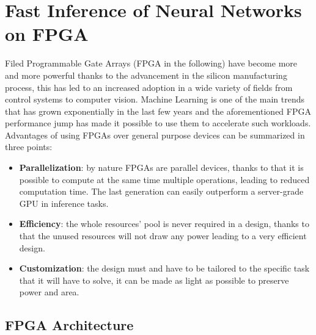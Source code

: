 \documentclass[../../main.tex]{subfiles}
\begin{document}
    
    \chapter{Fast Inference of Neural Networks on FPGA}
    \label{sec:FPGA_NN}
    
Filed Programmable Gate Arrays (FPGA in the following) have become more and more powerful thanks to the advancement in the silicon manufacturing process, this has led to an increased adoption in a wide variety of fields from control systems to computer vision.  
Machine Learning is one of the main trends that has grown exponentially in the last few years and the aforementioned FPGA performance jump has made it possible to use them to accelerate such workloads.  
Advantages of using FPGAs over general purpose devices can be summarized in three points:  
\begin{itemize}
    \item \textbf{Parallelization}: by nature FPGAs are parallel devices, thanks to that it is possible to compute at the same time multiple operations, leading to reduced computation time. The last generation can easily outperform a server-grade GPU in inference tasks\cite{FPGA-inf}.
    \item \textbf{Efficiency}: the whole resources' pool is never required in a design, thanks to that the unused resources will not draw any power leading to a very efficient design.  
    \item \textbf{Customization}: the design must and have to be tailored to the specific task that it will have to solve, it can be made as light as possible to preserve power and area.  
\end{itemize}
    
    
\section{FPGA Architecture}
\label{sec:FPGA_struct}
\end{document}
